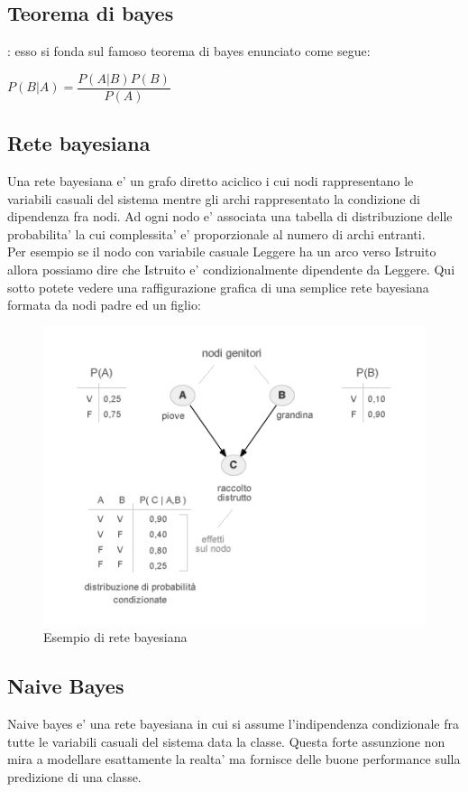 \subsection*{Teorema di bayes}
: esso si fonda sul famoso teorema di bayes enunciato come segue:
\begin{center}
	$P(B|A) = \dfrac{P(A|B)P(B)}{P(A)}$
\end{center}
\subsection*{Rete bayesiana}
Una rete bayesiana e' un grafo diretto aciclico i cui nodi rappresentano le variabili casuali del sistema mentre gli archi rappresentato la condizione di dipendenza fra nodi.
 Ad ogni nodo e' associata una tabella di distribuzione delle probabilita' la cui complessita' e' proporzionale al numero di archi entranti.\\ Per esempio se il nodo con variabile casuale Leggere ha un arco verso Istruito allora possiamo dire che Istruito e' condizionalmente dipendente da Leggere. Qui sotto potete vedere una raffigurazione grafica di una semplice rete bayesiana formata da nodi padre ed un figlio:
\begin{figure}[H]
	\centering
	\includegraphics[width=0.7\linewidth]{img/rete-bayesiana-grafo.png}
	\caption{Esempio di rete bayesiana}
	\label{fig:rete-bayesiana-grafo}
\end{figure}
\medskip
\subsection*{Naive Bayes}
Naive bayes e' una rete bayesiana in cui si assume l'indipendenza condizionale fra tutte le variabili casuali del sistema data la classe. Questa forte assunzione non mira a modellare esattamente la realta' ma fornisce delle buone performance sulla predizione di una classe.

